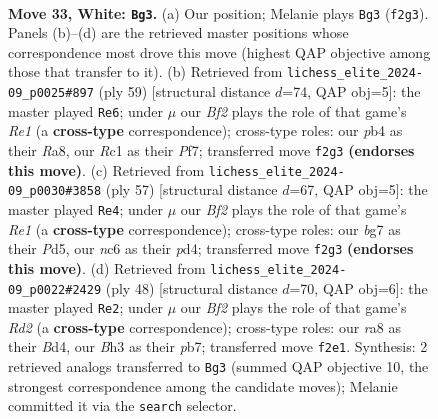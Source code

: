 \documentclass[11pt]{article}
\begin{document}
\clearpage

\begin{figure}[p]\centering
\begin{subfigure}{0.46\textwidth}\centering
\resizebox{\linewidth}{!}{%
\newchessgame
\chessboard[
  setfen={r6r/4k1bp/p1np2p1/4p1P1/1p2P2P/5P1B/PPPK1B2/R1R5 w - - 0 33},
  showmover=false,
  pgfstyle=straightmove, color=movearrow, markmove={f2-g3}
]}
\caption{}
\end{subfigure}\hfill
\begin{subfigure}{0.46\textwidth}\centering
\resizebox{\linewidth}{!}{%
\newchessgame
\chessboard[
  setfen={r3r1k1/5pp1/p1N4p/P2pp3/2p5/1bP1PP1P/1P2RKP1/R7 b - - 7 30},
  showmover=false,
  pgfstyle=straightmove, color=movearrow, markmove={e8-e6}
]}
\caption{}
\end{subfigure}
\\[4pt]
\begin{subfigure}{0.46\textwidth}\centering
\resizebox{\linewidth}{!}{%
\newchessgame
\chessboard[
  setfen={r3r1k1/1b4p1/2p3p1/ppPp4/3P2BP/1P4P1/P4PK1/R1R5 b - - 0 29},
  showmover=false,
  pgfstyle=straightmove, color=movearrow, markmove={e8-e4}
]}
\caption{}
\end{subfigure}\hfill
\begin{subfigure}{0.46\textwidth}\centering
\resizebox{\linewidth}{!}{%
\newchessgame
\chessboard[
  setfen={2k1r1r1/1pp4p/p2b4/6p1/PP1B1p2/2P2P2/3R1P1P/3R1K2 w - - 0 25},
  showmover=false,
  pgfstyle=straightmove, color=movearrow, markmove={d2-e2}
]}
\caption{}
\end{subfigure}
\caption{\textbf{Move 33, White: \texttt{Bg3}.} (a) Our position; Melanie plays \texttt{Bg3} (\texttt{f2g3}). Panels (b)--(d) are the retrieved master positions whose correspondence most drove this move (highest QAP objective among those that transfer to it). (b) Retrieved from \texttt{lichess\_elite\_2024-09\_p0025\#897} (ply 59) [structural distance $d$=74, QAP obj=5]: the master played \texttt{Re6}; under $\mu$ our \emph{Bf2} plays the role of that game's \emph{Re1} (a \textbf{cross-type} correspondence); cross-type roles: our \emph{p}b4 as their \emph{R}a8, our \emph{R}c1 as their \emph{P}f7; transferred move \texttt{f2g3} \textbf{(endorses this move)}. (c) Retrieved from \texttt{lichess\_elite\_2024-09\_p0030\#3858} (ply 57) [structural distance $d$=67, QAP obj=5]: the master played \texttt{Re4}; under $\mu$ our \emph{Bf2} plays the role of that game's \emph{Re1} (a \textbf{cross-type} correspondence); cross-type roles: our \emph{b}g7 as their \emph{P}d5, our \emph{n}c6 as their \emph{p}d4; transferred move \texttt{f2g3} \textbf{(endorses this move)}. (d) Retrieved from \texttt{lichess\_elite\_2024-09\_p0022\#2429} (ply 48) [structural distance $d$=70, QAP obj=6]: the master played \texttt{Re2}; under $\mu$ our \emph{Bf2} plays the role of that game's \emph{Rd2} (a \textbf{cross-type} correspondence); cross-type roles: our \emph{r}a8 as their \emph{B}d4, our \emph{B}h3 as their \emph{p}b7; transferred move \texttt{f2e1}. Synthesis: 2 retrieved analogs transferred to \texttt{Bg3} (summed QAP objective 10, the strongest correspondence among the candidate moves); Melanie committed it via the \texttt{search} selector.}
\label{fig:thought-m64}
\end{figure}
\end{document}
